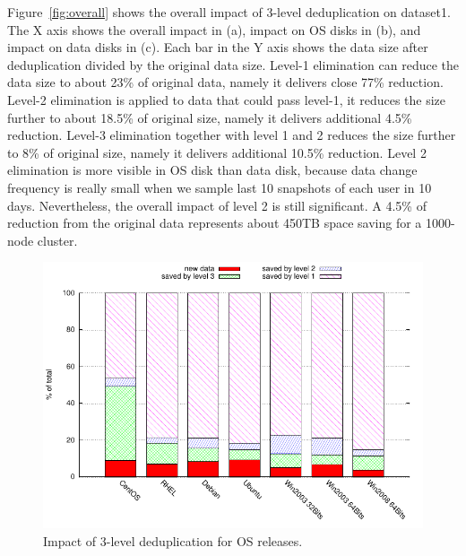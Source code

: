 Figure~\ref{fig:overall} shows the overall impact of 3-level deduplication on dataset1.
The X axis shows the overall impact in (a),  impact on OS disks in (b), and impact on data disks in (c).
Each bar in the Y axis shows the data size after deduplication divided by the original data size.
Level-1 elimination can reduce the data size to about 23\% of original data, namely it delivers close 77\% reduction.
Level-2 elimination is applied to data that could pass level-1, it
reduces the size further to about 18.5\% of original size, namely it delivers additional 4.5\% reduction.
Level-3 elimination together with level 1 and 2
reduces the size further to 8\% of original size, namely it delivers additional 10.5\% reduction.
Level 2 elimination is more visible in OS disk than data disk, because data change frequency is really small
when we sample last 10 snapshots of each user in 10 days. Nevertheless, the overall impact of level 2 is still significant.
A 4.5\% of reduction from the original data represents about 450TB space saving for a 1000-node cluster.


\begin{figure}
  \centering
  \includegraphics[width=5in]{images/3level_os.pdf}
  \caption{Impact of 3-level deduplication for OS releases.}
  \label{fig:oscds}
\end{figure}


